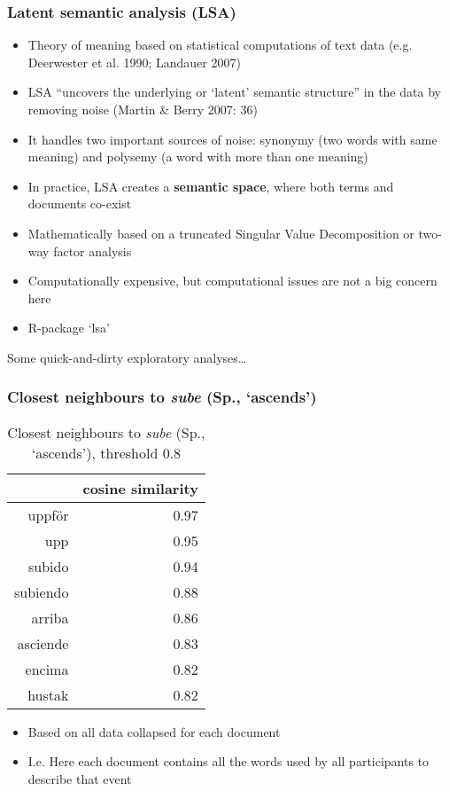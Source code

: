 \documentclass[]{beamer}
\begin{document}
\begin{frame}
	\frametitle{Latent semantic analysis (LSA)}
	\begin{itemize}
		\item Theory of meaning based on statistical computations of text data (e.g. Deerwester et al. 1990; Landauer 2007)
		\item LSA ``uncovers the underlying or `latent' semantic structure'' in the data by removing noise (Martin \& Berry 2007: 36)
		\item It handles two important sources of noise: synonymy (two words with same meaning) and polysemy (a word with more than one meaning)
		\item In practice, LSA creates a \textbf{semantic space}, where both terms and documents co-exist \pause
		\item Mathematically based on a truncated Singular Value Decomposition or two-way factor analysis
		\item Computationally expensive, but computational issues are not a big concern here
		\item R-package `lsa'
	\end{itemize}
\end{frame}

\begin{frame}
\begin{center}
Some quick-and-dirty exploratory analyses\ldots
\end{center}
\end{frame}

\begin{frame}
	\frametitle{Closest neighbours to \emph{sube} (Sp., `ascends')}
	\begin{table}[ht]
\begin{center}
\begin{tabular}{rr}
  \hline
 & cosine similarity \\ 
  \hline
uppf\"{o}r & 0.97 \\ 
  upp & 0.95 \\ 
  subido & 0.94 \\ 
  subiendo & 0.88 \\ 
  arriba & 0.86 \\ 
  asciende & 0.83 \\ 
  encima & 0.82 \\ 
  hustak & 0.82 \\ 
     \hline
\end{tabular}
\end{center}
\caption{Closest neighbours to \emph{sube} (Sp., `ascends'), threshold $0.8$}
\end{table}
\begin{itemize}
	 \item Based on all data collapsed for each document
	 \item I.e. Here each document contains all the words used by all participants to describe that event
\end{itemize}
\end{frame}
\end{document}

